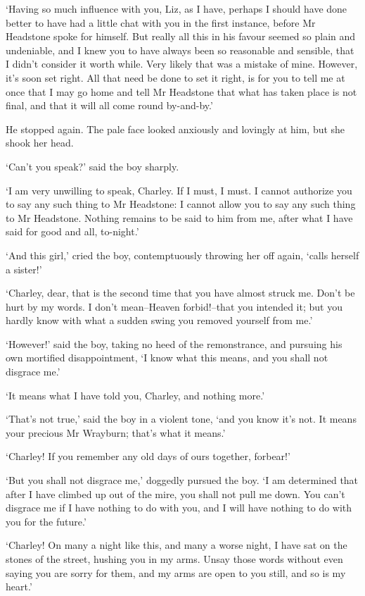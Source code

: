 ‘Having so much influence with you, Liz, as I have, perhaps I should
have done better to have had a little chat with you in the first
instance, before Mr Headstone spoke for himself. But really all this in
his favour seemed so plain and undeniable, and I knew you to have always
been so reasonable and sensible, that I didn’t consider it worth while.
Very likely that was a mistake of mine. However, it’s soon set right.
All that need be done to set it right, is for you to tell me at once
that I may go home and tell Mr Headstone that what has taken place is
not final, and that it will all come round by-and-by.’

He stopped again. The pale face looked anxiously and lovingly at him,
but she shook her head.

‘Can’t you speak?’ said the boy sharply.

‘I am very unwilling to speak, Charley. If I must, I must. I cannot
authorize you to say any such thing to Mr Headstone: I cannot allow you
to say any such thing to Mr Headstone. Nothing remains to be said to him
from me, after what I have said for good and all, to-night.’

‘And this girl,’ cried the boy, contemptuously throwing her off again,
‘calls herself a sister!’

‘Charley, dear, that is the second time that you have almost struck
me. Don’t be hurt by my words. I don’t mean--Heaven forbid!--that you
intended it; but you hardly know with what a sudden swing you removed
yourself from me.’

‘However!’ said the boy, taking no heed of the remonstrance, and
pursuing his own mortified disappointment, ‘I know what this means, and
you shall not disgrace me.’

‘It means what I have told you, Charley, and nothing more.’

‘That’s not true,’ said the boy in a violent tone, ‘and you know it’s
not. It means your precious Mr Wrayburn; that’s what it means.’

‘Charley! If you remember any old days of ours together, forbear!’

‘But you shall not disgrace me,’ doggedly pursued the boy. ‘I am
determined that after I have climbed up out of the mire, you shall not
pull me down. You can’t disgrace me if I have nothing to do with you,
and I will have nothing to do with you for the future.’

‘Charley! On many a night like this, and many a worse night, I have sat
on the stones of the street, hushing you in my arms. Unsay those words
without even saying you are sorry for them, and my arms are open to you
still, and so is my heart.’

